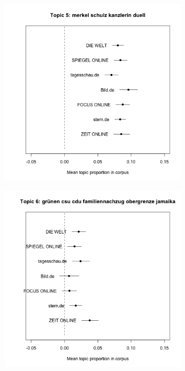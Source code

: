 \documentclass[12pt,a4paper,notitlepage]{article}
\begin{document}
\begin{figure}[H]
\begin{center}
\begin{subfigure}[normla]{0.2\textwidth}
		\end{subfigure}
				\begin{subfigure}[normla]{0.2\textwidth}
			\includegraphics[width=\textwidth]{../figs/estimate_effect5.png}
		\end{subfigure}
				\begin{subfigure}[normla]{0.2\textwidth}
			\includegraphics[width=\textwidth]{../figs/estimate_effect6.png}

\end{subfigure}
\end{center}
\end{figure}
\end{document}
